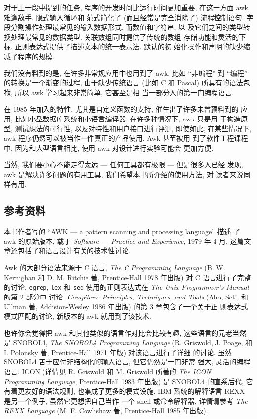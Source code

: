 对于上一段中提到的任务, 程序的开发时间比运行时间更加重要, 在这一方面
awk 难逢敌手. 隐式输入循环和 \patact 范式简化了 (而且经常是完全消除了)
流程控制语句. 字段分割操作处理最常见的输入数据形式, 而数值和字符串, 以
及它们之间的类型转换处理最常见的数据类型. 关联数组同时提供了传统的数组
存储功能和灵活的下标. 正则表达式提供了描述文本的统一表示法. 默认的初
始化操作和声明的缺少缩减了程序的规模.

我们没有料到的是, 在许多非常规应用中也用到了 awk. 比如 ``非编程'' 到
``编程'' 的转换是一个渐变的过程, 由于缺少传统语言 (比如
C 和 Pascal) 所具有的语法包袱, 所以 awk 学习起来非常简单, 它甚至是相
当一部分人的第一门编程语言.

在 1985 年加入的特性, 尤其是自定义函数的支持, 催生出了许多未曾预料到的
应用, 比如小型数据库系统和小语言编译器. 在许多种情况下, awk 只是用
于构造原型, 测试想法的可行性, 以及对特性和用户接口进行评测, 即使如此,
在某些情况下, awk 程序仍然可以被当作一件真正的产品使用. Awk 甚至被用
到了软件工程课程中, 因为和大型语言相比, 使用 awk 对设计进行实验可能会
更加方便.

当然, 我们要小心不能走得太远 --- 任何工具都有极限 --- 但是很多人已经
发现, awk 是解决许多问题的有用工具, 我们希望本书所介绍的使用方法, 对
读者来说同样有用.

\subsection*{参考资料}

本书作者写的 ``AWK --- a pattern scanning and processing language'' 描述
了 awk 的原始版本, 载于 \textit{Software --- Practice and Experience},
1979 年 4 月, 这篇文章还包括了和语言设计有关的技术性讨论.

Awk 的大部分语法来源于 C 语言, \textit{The C Programming Language} 
(B. W. Kernighan 和 D. M. Ritchie 著, Prentice-Hall 1978 年出版)
对 C 语言进行了完整的讨论. \texttt{egrep}, \texttt{lex} 和 \texttt{sed}
使用的正则表达式在 \textit{The Unix Programmer's Manual} 的第 2 部分中
讨论. \textit{Compilers: Principles, Techniques, and Tools} (Aho, Seti, 
和 Ullman 著, Addision-Wesley 1986 年出版) 的第 3 章包含了一个关于正
则表达式模式匹配的讨论, 新版本的 awk 就用到了该技术.

也许你会觉得把 awk 和其他类似的语言作对比会比较有趣, 这些语言的元老当然
是 SNOBOL4, \textit{The SNOBOL4 Programming Language} (R. Griswold, J.
Poage, 和 I. Polonsky 著, Prentice-Hall 1971 年版) 对该语言进行了详细
的讨论. 虽然 SNOBOL4 苦于应付非结构化的输入语言, 但它仍然是一门非常
强大, 灵活的编程语言. ICON (详情见 R. Griswold 和 M. Griswold 所著的
\textit{The ICON Programming Language}, Prentice-Hall 1983 年出版) 是
SNOBOL4 的直系后代, 它有着更友好的语法规则, 也集成了更多的模式设施.
IBM 系统的解释语言 REXX 是另一个例子, 虽然它更想把自己当作
一个 shell 或命令解释器, 详情请参考 \textit{The REXX Language} (M. F.
Cowlishaw 著, Prentice-Hall 1985 年出版).
